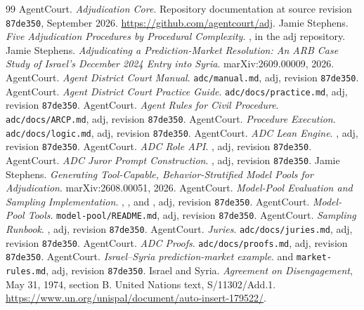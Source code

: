 \documentclass[11pt]{article}
\newcommand{\code}[1]{\texttt{#1}}
\begin{document}
\begin{thebibliography}{99}
 AgentCourt.  \emph{Adjudication Core}.  Repository documentation at source revision \code{87de350}, September 2026.  \url{https://github.com/agentcourt/adj}.
 Jamie Stephens.  \emph{Five Adjudication Procedures by Procedural Complexity}.  , in the adj repository.
 Jamie Stephens.  \emph{Adjudicating a Prediction-Market Resolution: An ARB Case Study of Israel's December 2024 Entry into Syria}.  marXiv:2609.00009, 2026.
 AgentCourt.  \emph{Agent District Court Manual}.  \code{adc/manual.md}, adj, revision \code{87de350}.
 AgentCourt.  \emph{Agent District Court Practice Guide}.  \code{adc/docs/practice.md}, adj, revision \code{87de350}.
 AgentCourt.  \emph{Agent Rules for Civil Procedure}.  \code{adc/docs/ARCP.md}, adj, revision \code{87de350}.
 AgentCourt.  \emph{Procedure Execution}.  \code{adc/docs/logic.md}, adj, revision \code{87de350}.
 AgentCourt.  \emph{ADC Lean Engine}.  , adj, revision \code{87de350}.
 AgentCourt.  \emph{ADC Role API}.  , adj, revision \code{87de350}.
 AgentCourt.  \emph{ADC Juror Prompt Construction}.  , adj, revision \code{87de350}.
 Jamie Stephens.  \emph{Generating Tool-Capable, Behavior-Stratified Model Pools for Adjudication}.  marXiv:2608.00051, 2026.
 AgentCourt.  \emph{Model-Pool Evaluation and Sampling Implementation}.  , , and , adj, revision \code{87de350}.
 AgentCourt.  \emph{Model-Pool Tools}.  \code{model-pool/README.md}, adj, revision \code{87de350}.
 AgentCourt.  \emph{Sampling Runbook}.  , adj, revision \code{87de350}.
 AgentCourt.  \emph{Juries}.  \code{adc/docs/juries.md}, adj, revision \code{87de350}.
 AgentCourt.  \emph{ADC Proofs}.  \code{adc/docs/proofs.md}, adj, revision \code{87de350}.
 AgentCourt.  \emph{Israel--Syria prediction-market example}.   and \code{market-rules.md}, adj, revision \code{87de350}.
 Israel and Syria.  \emph{Agreement on Disengagement}, May 31, 1974, section B.  United Nations text, S/11302/Add.1.  \url{https://www.un.org/unispal/document/auto-insert-179522/}.

\end{thebibliography}
\end{document}
